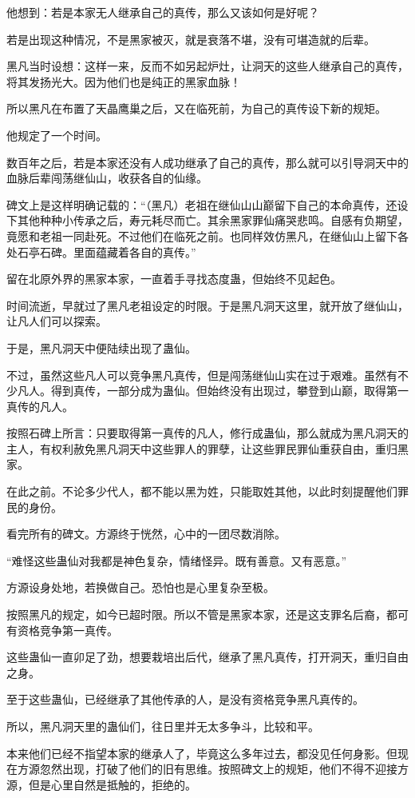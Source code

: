 \begin{this_body}
他想到：若是本家无人继承自己的真传，那么又该如何是好呢？

若是出现这种情况，不是黑家被灭，就是衰落不堪，没有可堪造就的后辈。

黑凡当时设想：这样一来，反而不如另起炉灶，让洞天的这些人继承自己的真传，将其发扬光大。因为他们也是纯正的黑家血脉！

所以黑凡在布置了天晶鹰巢之后，又在临死前，为自己的真传设下新的规矩。

他规定了一个时间。

数百年之后，若是本家还没有人成功继承了自己的真传，那么就可以引导洞天中的血脉后辈闯荡继仙山，收获各自的仙缘。

碑文上是这样明确记载的：“（黑凡）老祖在继仙山山巅留下自己的本命真传，还设下其他种种小传承之后，寿元耗尽而亡。其余黑家罪仙痛哭悲鸣。自感有负期望，竟愿和老祖一同赴死。不过他们在临死之前。也同样效仿黑凡，在继仙山上留下各处石亭石碑。里面蕴藏着各自的真传。”

留在北原外界的黑家本家，一直着手寻找态度蛊，但始终不见起色。

时间流逝，早就过了黑凡老祖设定的时限。于是黑凡洞天这里，就开放了继仙山，让凡人们可以探索。

于是，黑凡洞天中便陆续出现了蛊仙。

不过，虽然这些凡人可以竞争黑凡真传，但是闯荡继仙山实在过于艰难。虽然有不少凡人。得到真传，一部分成为蛊仙。但始终没有出现过，攀登到山巅，取得第一真传的凡人。

按照石碑上所言：只要取得第一真传的凡人，修行成蛊仙，那么就成为黑凡洞天的主人，有权利赦免黑凡洞天中这些罪人的罪孽，让这些罪民罪仙重获自由，重归黑家。

在此之前。不论多少代人，都不能以黑为姓，只能取姓其他，以此时刻提醒他们罪民的身份。

看完所有的碑文。方源终于恍然，心中的一团尽数消除。

“难怪这些蛊仙对我都是神色复杂，情绪怪异。既有善意。又有恶意。”

方源设身处地，若换做自己。恐怕也是心里复杂至极。

按照黑凡的规定，如今已超时限。所以不管是黑家本家，还是这支罪名后裔，都可有资格竞争第一真传。

这些蛊仙一直卯足了劲，想要栽培出后代，继承了黑凡真传，打开洞天，重归自由之身。

至于这些蛊仙，已经继承了其他传承的人，是没有资格竞争黑凡真传的。

所以，黑凡洞天里的蛊仙们，往日里并无太多争斗，比较和平。

本来他们已经不指望本家的继承人了，毕竟这么多年过去，都没见任何身影。但现在方源忽然出现，打破了他们的旧有思维。按照碑文上的规矩，他们不得不迎接方源，但是心里自然是抵触的，拒绝的。


\end{this_body}
